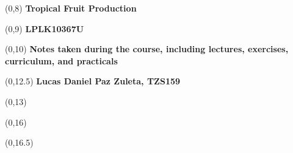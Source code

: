 \begin{titlepage}

    
    \begin{textblock}{9.4}(0,8)
        \Huge{\selectfont\bfseries{Tropical Fruit Production}}
    \end{textblock}
    \begin{textblock}{9.4}(0,9)
        \Huge{\selectfont\bfseries{LPLK10367U}}
    \end{textblock}
    
    \begin{textblock}{9.4}(0,10)
        \LARGE{\selectfont\bfseries{Notes taken during the course, including lectures, exercises, curriculum, and practicals}}
    \end{textblock}
    
    \begin{textblock}{9.4}(0,12.5)
        \large{\selectfont\bfseries{
        Lucas Daniel Paz Zuleta, TZS159}}
    \end{textblock}
    
    \begin{textblock}{9.4}(0,13)
        \large{\selectfont{MSc student at the University of Copenhagen}}
    \end{textblock}
    
    \begin{textblock}{9.4}(0,16)
        \large{\selectfont{Last compiled: \today}}
    \end{textblock}
    
    \begin{textblock}{8.4}(0,16.5)
        \large{}
    \end{textblock}
    
    
    
    
    \end{titlepage}